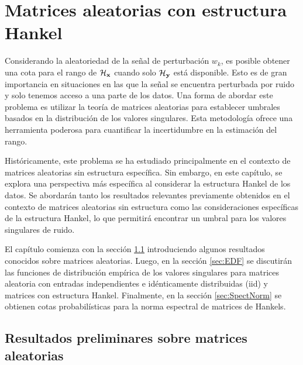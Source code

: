 \chapter{Matrices aleatorias con estructura Hankel}\label{chap:RandomHankel}

	Considerando la aleatoriedad de la señal de perturbación $w_k$, es posible obtener una cota para el rango de $\mathcal{H}_{\mathbf{x}}$ cuando solo $\mathcal{H}_{\mathbf{y}}$ está disponible. Esto es de gran importancia en situaciones en las que la señal se encuentra perturbada por ruido y solo tenemos acceso a una parte de los datos. Una forma de abordar este problema es utilizar la teoría de matrices aleatorias para establecer umbrales basados en la distribución de los valores singulares. Esta metodología ofrece una herramienta poderosa para cuantificar la incertidumbre en la estimación del rango.
    
    Históricamente, este problema se ha estudiado principalmente en el contexto de matrices aleatorias sin estructura específica. Sin embargo, en este capítulo, se explora una perspectiva más específica al considerar la estructura Hankel de los datos. Se abordarán tanto los resultados relevantes previamente obtenidos en el contexto de matrices aleatorias sin estructura como las consideraciones específicas de la estructura Hankel, lo que permitirá encontrar un umbral para los valores singulares de ruido.

	El capítulo comienza con la sección \ref{sec:RTM} introduciendo algunos resultados conocidos sobre matrices aleatorias. Luego, en la sección \ref{sec:EDF} se discutirán las funciones de distribución empírica de los valores singulares para matrices aleatoria con entradas independientes e idénticamente distribuidas (iid) y matrices con estructura Hankel. Finalmente, en la sección \ref{sec:SpectNorm} se obtienen cotas probabilísticas para la norma espectral de matrices de Hankels.   

\section{Resultados preliminares sobre matrices aleatorias}\label{sec:RTM}


